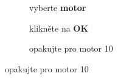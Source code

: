 \documentclass[../main.tex]{subfiles}
\begin{document}
	\begin{figure}[h!]%
		\begin{subfigure}{.3\textwidth}%
			\centering%
			\caption{vyberte \textbf{motor}}%
		\end{subfigure} \hspace{.045\textwidth}%
		\begin{subfigure}{.3\textwidth}%
			\centering%
			\caption{klikněte na \textbf{OK}}%
		\end{subfigure} \hspace{.045\textwidth}%
		\begin{subfigure}{.3\textwidth}%
			\centering%
			\caption{opakujte pro motor 10}%
		\end{subfigure}%
	\end{figure}
\end{document}
